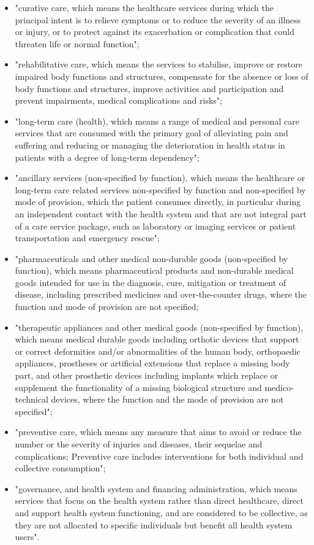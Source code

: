 \documentclass[12pt,english,a4paper]{article}
\begin{document}
\begin{enumerate}
\begin{itemize}
\item "curative care, which means the healthcare services during which the principal intent is to relieve symptoms or to reduce the severity of an illness or injury, or to protect against its exacerbation or complication that could threaten life or normal function";
\item "rehabilitative care, which means the services to stabilise, improve or restore impaired body functions and structures, compensate for the absence or loss of body functions and structures, improve activities and participation and prevent impairments, medical complications and risks";
\item "long-term care (health), which means a range of medical and personal care services that are consumed with the primary goal of alleviating pain and suffering and reducing or managing the deterioration in health status in patients with a degree of long-term dependency";
\item "ancillary services (non-specified by function), which means the healthcare or long-term care related services non-specified by function and non-specified by mode of provision, which the patient consumes directly, in particular during an independent contact with the health system and that are not integral part of a care service package, such as laboratory or imaging services or patient transportation and emergency rescue";
\item "pharmaceuticals and other medical non-durable goods (non-specified by function), which means pharmaceutical products and non-durable medical goods intended for use in the diagnosis, cure, mitigation or treatment of disease, including prescribed medicines and over-the-counter drugs, where the function and mode of provision are not specified;
\item "therapeutic appliances and other medical goods (non-specified by function), which means medical durable goods including orthotic devices that support or correct deformities and/or abnormalities of the human body, orthopaedic appliances, prostheses or artificial extensions that replace a missing body part, and other prosthetic devices including implants which replace or supplement the functionality of a missing biological structure and medico-technical devices, where the function and the mode of provision are not specified";
\item "preventive care, which means any measure that aims to avoid or reduce the number or the severity of injuries and diseases, their sequelae and complications; Preventive care includes interventions for both individual and collective consumption";
\item "governance, and health system and financing administration, which means services that focus on the health system rather than direct healthcare, direct and support health system functioning, and are considered to be collective, as they are not allocated to specific individuals but benefit all health system users".
\end{itemize}


\end{enumerate}
\end{document}
